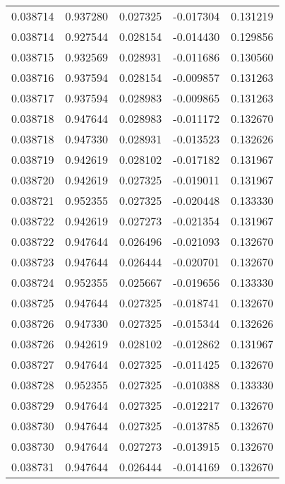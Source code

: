 \begin{tabular}{lrrrr}
0.038714    &  0.937280 &  0.027325 & -0.017304 &             0.131219 \\
0.038714    &  0.927544 &  0.028154 & -0.014430 &             0.129856 \\
0.038715    &  0.932569 &  0.028931 & -0.011686 &             0.130560 \\
0.038716    &  0.937594 &  0.028154 & -0.009857 &             0.131263 \\
0.038717    &  0.937594 &  0.028983 & -0.009865 &             0.131263 \\
0.038718    &  0.947644 &  0.028983 & -0.011172 &             0.132670 \\
0.038718    &  0.947330 &  0.028931 & -0.013523 &             0.132626 \\
0.038719    &  0.942619 &  0.028102 & -0.017182 &             0.131967 \\
0.038720    &  0.942619 &  0.027325 & -0.019011 &             0.131967 \\
0.038721    &  0.952355 &  0.027325 & -0.020448 &             0.133330 \\
0.038722    &  0.942619 &  0.027273 & -0.021354 &             0.131967 \\
0.038722    &  0.947644 &  0.026496 & -0.021093 &             0.132670 \\
0.038723    &  0.947644 &  0.026444 & -0.020701 &             0.132670 \\
0.038724    &  0.952355 &  0.025667 & -0.019656 &             0.133330 \\
0.038725    &  0.947644 &  0.027325 & -0.018741 &             0.132670 \\
0.038726    &  0.947330 &  0.027325 & -0.015344 &             0.132626 \\
0.038726    &  0.942619 &  0.028102 & -0.012862 &             0.131967 \\
0.038727    &  0.947644 &  0.027325 & -0.011425 &             0.132670 \\
0.038728    &  0.952355 &  0.027325 & -0.010388 &             0.133330 \\
0.038729    &  0.947644 &  0.027325 & -0.012217 &             0.132670 \\
0.038730    &  0.947644 &  0.027325 & -0.013785 &             0.132670 \\
0.038730    &  0.947644 &  0.027273 & -0.013915 &             0.132670 \\
0.038731    &  0.947644 &  0.026444 & -0.014169 &             0.132670 \\

\end{tabular}

